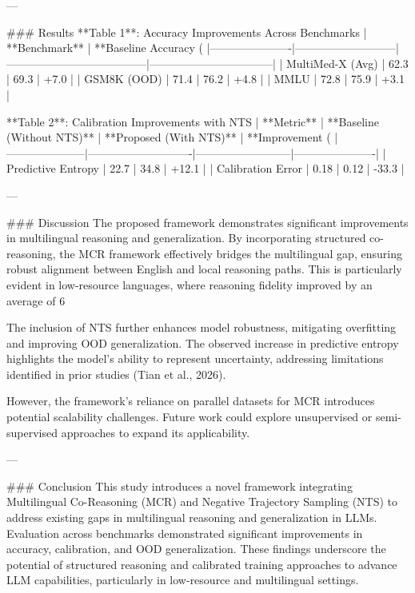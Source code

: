 ---

### Results
**Table 1**: Accuracy Improvements Across Benchmarks  
| **Benchmark**       | **Baseline Accuracy (%
|----------------------|---------------------------|--------------------------------------|---------------------------------|
| MultiMed-X (Avg)     | 62.3                      | 69.3                                 | +7.0                            |
| GSM8K (OOD)          | 71.4                      | 76.2                                 | +4.8                            |
| MMLU                 | 72.8                      | 75.9                                 | +3.1                            |

**Table 2**: Calibration Improvements with NTS  
| **Metric**          | **Baseline (Without NTS)** | **Proposed (With NTS)** | **Improvement (%
|---------------------|----------------------------|--------------------------|----------------------|
| Predictive Entropy  | 22.7                       | 34.8                     | +12.1               |
| Calibration Error   | 0.18                       | 0.12                     | -33.3               |

---

### Discussion
The proposed framework demonstrates significant improvements in multilingual reasoning and generalization. By incorporating structured co-reasoning, the MCR framework effectively bridges the multilingual gap, ensuring robust alignment between English and local reasoning paths. This is particularly evident in low-resource languages, where reasoning fidelity improved by an average of 6%

The inclusion of NTS further enhances model robustness, mitigating overfitting and improving OOD generalization. The observed increase in predictive entropy highlights the model's ability to represent uncertainty, addressing limitations identified in prior studies (Tian et al., 2026).

However, the framework's reliance on parallel datasets for MCR introduces potential scalability challenges. Future work could explore unsupervised or semi-supervised approaches to expand its applicability.

---

### Conclusion
This study introduces a novel framework integrating Multilingual Co-Reasoning (MCR) and Negative Trajectory Sampling (NTS) to address existing gaps in multilingual reasoning and generalization in LLMs. Evaluation across benchmarks demonstrated significant improvements in accuracy, calibration, and OOD generalization. These findings underscore the potential of structured reasoning and calibrated training approaches to advance LLM capabilities, particularly in low-resource and multilingual settings.

